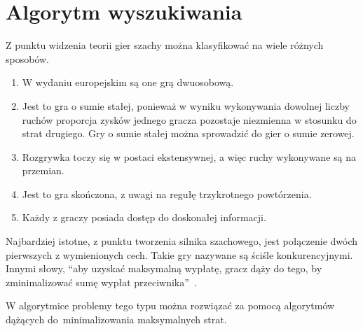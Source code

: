\section{Algorytm wyszukiwania}
\label {sec:algorytm-wyszukiwania}


Z punktu widzenia teorii gier szachy można klasyfikować na wiele różnych sposobów.
\begin{enumerate}
    \item W wydaniu europejskim są one grą dwuosobową.
    \item Jest to gra o sumie stałej, ponieważ w wyniku wykonywania dowolnej liczby ruchów proporcja zysków jednego gracza pozostaje niezmienna w stosunku do strat drugiego.
    Gry o sumie stałej można sprowadzić do gier o sumie zerowej.
    \item Rozgrywka toczy się w postaci ekstensywnej, a więc ruchy wykonywane są na przemian.
    \item Jest to gra skończona, z uwagi na regułę trzykrotnego powtórzenia.
    \item Każdy z graczy posiada dostęp do doskonałej informacji.
\end{enumerate}

Najbardziej istotne, z punktu tworzenia silnika szachowego, jest połączenie dwóch pierwszych z wymienionych cech.
Takie gry nazywane są ściśle konkurencyjnymi.
Innymi słowy, \enquote{aby uzyskać maksymalną wypłatę, gracz dąży do tego, by zminimalizować sumę wypłat przeciwnika}~\cite*{wstep-teoria-gier}.

W algorytmice problemy tego typu można rozwiązać za pomocą algorytmów dążących do~minimalizowania maksymalnych strat.


